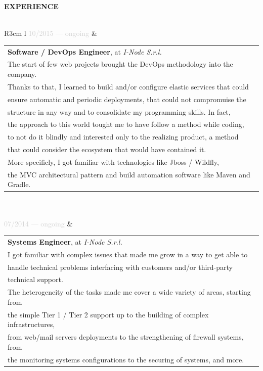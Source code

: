 \documentclass{article}
\begin{document}
\textbf{\textcolor{deepblue}{EXPERIENCE}} \\\\ \hfill
\begin{tabular}{ R{3cm} l }
	\textcolor{lightgray}{10/2015 — ongoing} & \begin{tabular}[l]{@{}l@{}}
	\textbf{Software / DevOps Engineer}, at \textit{I-Node S.r.l.} \\
	The start of few web projects brought the DevOps methodology into the company. \\
	Thanks to that, I learned to build and/or configure elastic services that could \\
	ensure automatic and periodic deployments, that could not compromuise the \\
	structure in any way and to consolidate my programming skills. In fact, \\
	the approach to this world tought me to have follow a method while coding, \\
	to not do it blindly and interested only to the realizing product, a method \\
	that could consider the ecosystem that would have contained it. \\
	More specificly, I got familiar with technologies like Jboss / Wildfly, \\
	the MVC architectural pattern and build automation software like Maven and Gradle.
\end{tabular} \\\\ \hfill
\textcolor{lightgray}{07/2014 — ongoing}   & \begin{tabular}[l]{@{}l@{}}
\textbf{Systems Engineer}, at \textit{I-Node S.r.l.} \\
I got familiar with complex issues that made me grow in a way to get able to \\
handle technical problems interfacing with customers and/or third-party \\
technical support. \\
The heterogeneity of the tasks made me cover a wide variety of areas, starting from \\
the simple Tier 1 / Tier 2 support up to the building of complex infrastructures, \\
from web/mail servers deployments to the strengthening of firewall systems, from \\
the monitoring systems configurations to the securing of systems, and more.
\end{tabular} \\\\ \hfill
\end{tabular}
\end{document}
